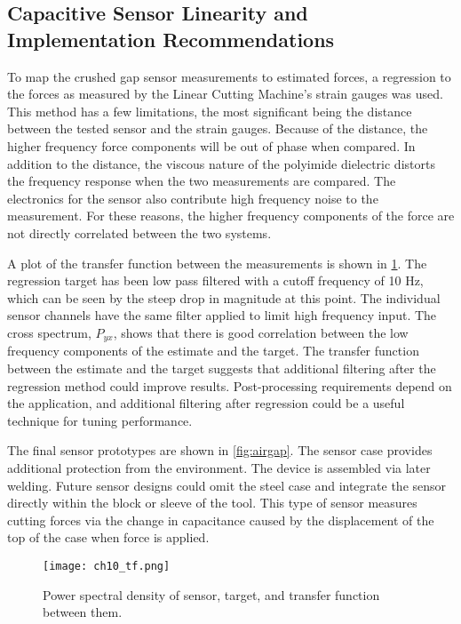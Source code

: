 \subsection{Capacitive Sensor Linearity and Implementation Recommendations
\label{chap:10}}

To map the crushed gap sensor measurements to estimated forces, 
a regression to the forces as measured by the 
Linear Cutting Machine's strain gauges was used.
This method has a few limitations, the most significant
being the distance between the tested sensor and the strain gauges.
Because of the distance, the higher frequency force components will
be out of phase when compared. 
In addition to the distance, the viscous nature of the polyimide dielectric distorts the 
frequency response when the two measurements are compared.
The electronics for the sensor also contribute high frequency noise to the measurement.
For these reasons, the higher frequency components of the force are not directly correlated 
between the two systems. 

A plot of the transfer function between the measurements is shown in \ref{fig:sense_tf}.
The regression target has been low pass filtered with a cutoff frequency of 10 Hz,
which can be seen by the steep drop in magnitude at this point.
The individual sensor channels have the same filter applied to limit high frequency input.
The cross spectrum, $P_{yx}$, shows that there is good correlation between the low frequency
components of the estimate and the target.
The transfer function between the estimate and the target suggests that additional 
filtering after the regression method could improve results.
Post-processing requirements depend on the application, and 
additional filtering after regression could be a useful technique for tuning performance.

The final sensor prototypes are shown in \ref{fig:airgap}.
The sensor case provides additional protection from the environment.
The device is assembled via later welding.
Future sensor designs could omit the steel case and integrate the sensor directly within
the block or sleeve of the tool.
This type of sensor measures cutting forces via the change in capacitance caused
by the displacement of the top of the case when force is applied. 

\begin{figure}[ht]
\centering
\texttt{[image: ch10\_tf.png]}
\caption{
Power spectral density of sensor, target, and transfer function between them.
}
\label{fig:sense_tf}
\end{figure}


